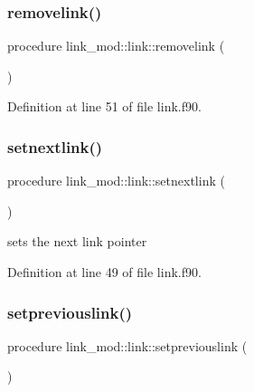 \subsubsection{\texorpdfstring{removelink()}{removelink()}}
{\footnotesize\ttfamily procedure link\+\_\+mod\+::link\+::removelink (\begin{DoxyParamCaption}{ }\end{DoxyParamCaption})\hspace{0.3cm}{\ttfamily [private]}}



Definition at line 51 of file link.\+f90.

\mbox{\label{structlink__mod_1_1link_a1cf24a9d0cfcd507358f7561b877d137}} 
\subsubsection{\texorpdfstring{setnextlink()}{setnextlink()}}
{\footnotesize\ttfamily procedure link\+\_\+mod\+::link\+::setnextlink (\begin{DoxyParamCaption}{ }\end{DoxyParamCaption})\hspace{0.3cm}{\ttfamily [private]}}



sets the next link pointer 



Definition at line 49 of file link.\+f90.

\mbox{\label{structlink__mod_1_1link_aea2009bb7460c79ae58d5775b51ec45c}} 
\subsubsection{\texorpdfstring{setpreviouslink()}{setpreviouslink()}}
{\footnotesize\ttfamily procedure link\+\_\+mod\+::link\+::setpreviouslink (\begin{DoxyParamCaption}{ }\end{DoxyParamCaption})\hspace{0.3cm}{\ttfamily [private]}}



